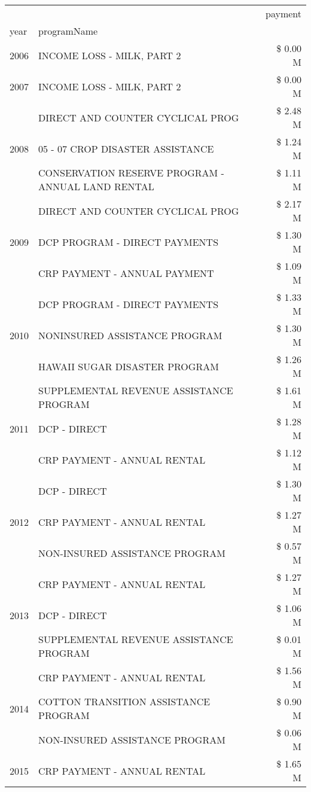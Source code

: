 \begin{tabular}{llr}
\toprule
 &  & payment \\
year & programName &  \\
\midrule
2006 & INCOME LOSS - MILK, PART 2 & \$ 0.00 M \\
\cline{1-3}
2007 & INCOME LOSS - MILK, PART 2 & \$ 0.00 M \\
\cline{1-3}
\multirow[t]{3}{*}{2008} & DIRECT AND COUNTER CYCLICAL PROG & \$ 2.48 M \\
 & 05 - 07 CROP DISASTER ASSISTANCE & \$ 1.24 M \\
 & CONSERVATION RESERVE PROGRAM - ANNUAL LAND RENTAL & \$ 1.11 M \\
\cline{1-3}
\multirow[t]{3}{*}{2009} & DIRECT AND COUNTER CYCLICAL PROG & \$ 2.17 M \\
 & DCP PROGRAM - DIRECT PAYMENTS & \$ 1.30 M \\
 & CRP PAYMENT - ANNUAL PAYMENT & \$ 1.09 M \\
\cline{1-3}
\multirow[t]{3}{*}{2010} & DCP PROGRAM - DIRECT PAYMENTS & \$ 1.33 M \\
 & NONINSURED ASSISTANCE PROGRAM & \$ 1.30 M \\
 & HAWAII SUGAR DISASTER PROGRAM & \$ 1.26 M \\
\cline{1-3}
\multirow[t]{3}{*}{2011} & SUPPLEMENTAL REVENUE ASSISTANCE PROGRAM & \$ 1.61 M \\
 & DCP - DIRECT & \$ 1.28 M \\
 & CRP PAYMENT - ANNUAL RENTAL & \$ 1.12 M \\
\cline{1-3}
\multirow[t]{3}{*}{2012} & DCP - DIRECT & \$ 1.30 M \\
 & CRP PAYMENT - ANNUAL RENTAL & \$ 1.27 M \\
 & NON-INSURED ASSISTANCE PROGRAM & \$ 0.57 M \\
\cline{1-3}
\multirow[t]{3}{*}{2013} & CRP PAYMENT - ANNUAL RENTAL & \$ 1.27 M \\
 & DCP - DIRECT & \$ 1.06 M \\
 & SUPPLEMENTAL REVENUE ASSISTANCE PROGRAM & \$ 0.01 M \\
\cline{1-3}
\multirow[t]{3}{*}{2014} & CRP PAYMENT - ANNUAL RENTAL & \$ 1.56 M \\
 & COTTON TRANSITION ASSISTANCE PROGRAM & \$ 0.90 M \\
 & NON-INSURED ASSISTANCE PROGRAM & \$ 0.06 M \\
\cline{1-3}
\multirow[t]{3}{*}{2015} & CRP PAYMENT - ANNUAL RENTAL & \$ 1.65 M \\

\end{tabular}
